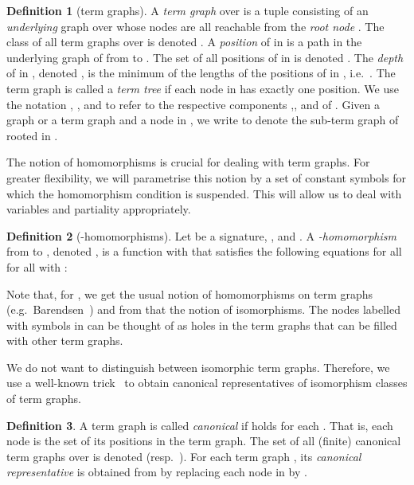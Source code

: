 \documentclass[copyright,creativecommons,UKenglish,final]{eptcs}
\theoremstyle{definition}
\newtheorem{definition}{Definition}[section]
\theoremstyle{plain}
\begin{document}
\begin{definition}[term graphs]
  \label{def:tgraph}
A \emph{term graph}  over  is a tuple 
  consisting of an \emph{underlying} graph  over
   whose nodes are all reachable from the \emph{root node}
  . The class of all term graphs over  is denoted
  . A \emph{position} of  in  is a path in the
  underlying graph of  from  to . The set of all positions of
   in  is denoted . The \emph{depth} of  in
  , denoted , is the minimum of the lengths of the
  positions of  in , i.e.\ . The term graph  is
  called a \emph{term tree} if each node in  has exactly one
  position. We use the notation , ,  and
   to refer to the respective components ,, 
  and  of . Given a graph or a term graph  and a node  in
  , we write  to denote the sub-term graph of 
  rooted in .
\end{definition}

The notion of homomorphisms is crucial for dealing with term
graphs. For greater flexibility, we will parametrise this notion by a
set of constant symbols  for which the homomorphism condition
is suspended. This will allow us to deal with variables and partiality
appropriately.
\begin{definition}[-homomorphisms]
  \label{def:D-hom}
Let  be a signature, , and
  . A \emph{-homomorphism}  from 
  to , denoted , is a function
   with  that satisfies
  the following equations for all for all  with :
  
\end{definition}

Note that, for , we get the usual notion of
homomorphisms on term graphs (e.g.\ Barendsen~\cite{barendsen03book})
and from that the notion of isomorphisms. The nodes labelled with
symbols in  can be thought of as holes in the term graphs that
can be filled with other term graphs.

We do not want to distinguish between isomorphic term
graphs. Therefore, we use a well-known trick~\cite{plump99hggcbgt} to
obtain canonical representatives of isomorphism classes of term
graphs.
\begin{definition}\label{def:canTgraph}
A term graph  is called \emph{canonical} if 
  holds for each . That is, each node is the set of its
  positions in the term graph. The set of all (finite) canonical term
  graphs over  is denoted  (resp.\
  ). For each term graph , its
  \emph{canonical representative}  is obtained from  by
  replacing each node  in  by .

\end{definition}
\end{document}
